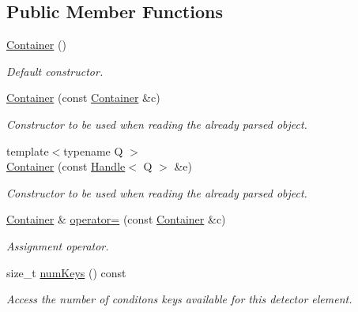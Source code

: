 \subsection*{Public Member Functions}
\begin{DoxyCompactItemize}
\item 
\hyperlink{class_d_d4hep_1_1_conditions_1_1_container_ad0e7655bed4af4372a7271a7ae15957f}{Container} ()
\begin{DoxyCompactList}\small\item\em Default constructor. \item\end{DoxyCompactList}\item 
\hyperlink{class_d_d4hep_1_1_conditions_1_1_container_a59770753d5b406ea121d2d71026f5a95}{Container} (const \hyperlink{class_d_d4hep_1_1_conditions_1_1_container}{Container} \&c)
\begin{DoxyCompactList}\small\item\em Constructor to be used when reading the already parsed object. \item\end{DoxyCompactList}\item 
{\footnotesize template$<$typename Q $>$ }\\\hyperlink{class_d_d4hep_1_1_conditions_1_1_container_ad410e344fd97b872c2195b9ed9010d02}{Container} (const \hyperlink{class_d_d4hep_1_1_handle}{Handle}$<$ Q $>$ \&e)
\begin{DoxyCompactList}\small\item\em Constructor to be used when reading the already parsed object. \item\end{DoxyCompactList}\item 
\hyperlink{class_d_d4hep_1_1_conditions_1_1_container}{Container} \& \hyperlink{class_d_d4hep_1_1_conditions_1_1_container_acdaccd39fc497da0eff7dfa97b5319f1}{operator=} (const \hyperlink{class_d_d4hep_1_1_conditions_1_1_container}{Container} \&c)
\begin{DoxyCompactList}\small\item\em Assignment operator. \item\end{DoxyCompactList}\item 
size\_\-t \hyperlink{class_d_d4hep_1_1_conditions_1_1_container_ad423d94cea1ea683a5279fea77ece42d}{numKeys} () const 
\begin{DoxyCompactList}\small\item\em Access the number of conditons keys available for this detector element. \item\end{DoxyCompactList}\item 

\end{DoxyCompactItemize}
